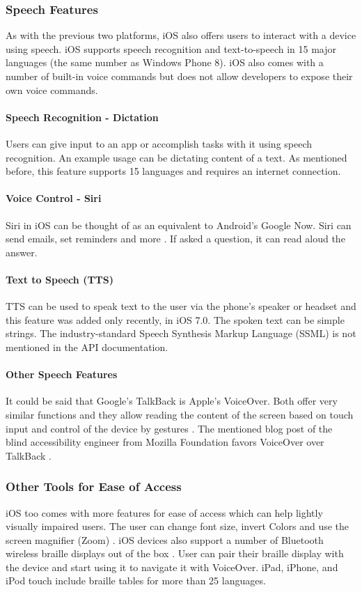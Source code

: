 \subsubsection{Speech Features}
As with the previous two platforms, iOS also offers users to interact with a device using speech. iOS supports speech recognition and text-to-speech in 15 major languages (the same number as Windows Phone 8).
iOS also comes with a number of built-in voice commands \cite{iosAccbility} but does not allow developers to expose their own voice commands.

\paragraph{Speech Recognition - Dictation}
Users can give input to an app or accomplish tasks with it using speech recognition. An example usage can be dictating content of a text. As mentioned before, this feature supports 15 languages and requires an internet connection.

\paragraph{Voice Control - Siri}
Siri in iOS can be thought of as an equivalent to Android's Google Now. Siri can send emails, set reminders and more \cite{iosAccbility}. If asked a question, it can read aloud the answer. 

\paragraph{Text to Speech (TTS)}
TTS can be used to speak text to the user via the phone's speaker or headset and this feature was added only recently, in iOS 7.0. The spoken text can be simple strings. The industry-standard Speech Synthesis Markup Language (SSML) is not mentioned in the API documentation.

\paragraph{Other Speech Features}
It could be said that Google's TalkBack is Apple's VoiceOver. Both offer very similar functions and they allow reading the content of the screen based on touch input and control of the device by gestures \cite{iosVoiceOver}.
The mentioned blog post of the blind accessibility engineer from Mozilla Foundation favors VoiceOver over TalkBack \cite{mozillaguy}.

\subsubsection{Other Tools for Ease of Access}
iOS too comes with more features for ease of access which can help lightly visually impaired users. The user can change font size, invert Colors and use the screen magnifier (Zoom) \cite{iosAccbility}.
iOS devices also support a number of Bluetooth wireless braille displays out of the box \cite{iosAccbility}. User can pair their braille display with the device and start using it to navigate it with VoiceOver. iPad, iPhone, and iPod touch include braille tables for more than 25 languages.

